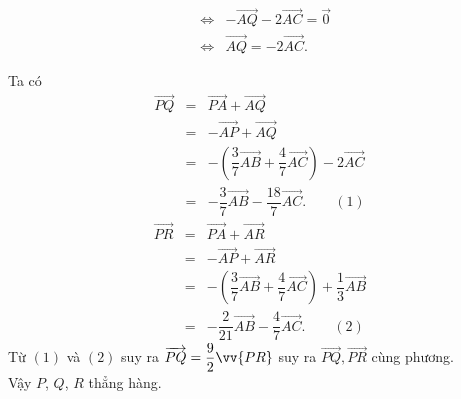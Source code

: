 \begin{bt}
{\begin{itemize}
\begin{eqnarray*}
		\\
		&\Leftrightarrow&
		-\overrightarrow{AQ}-2\overrightarrow{AC}=\overrightarrow{0}
		\\
		&\Leftrightarrow&
		\overrightarrow{AQ}=-2\overrightarrow{AC}.
	\end{eqnarray*}
	\end{itemize}	
	Ta có 
	\allowdisplaybreaks
	\begin{eqnarray*}
		\overrightarrow{PQ}&=&\overrightarrow{PA}+\overrightarrow{AQ}
		\\
		&=&-\overrightarrow{AP}+\overrightarrow{AQ}
		\\
		&=&-\left(\dfrac{3}{7}\overrightarrow{AB}+\dfrac{4}{7}\overrightarrow{AC}\right)-2\overrightarrow{AC}
		\\
		&=&-\dfrac{3}{7}\overrightarrow{AB}-\dfrac{18}{7}\overrightarrow{AC}. \qquad(1)
	\end{eqnarray*}
	\allowdisplaybreaks
	\begin{eqnarray*}
		\overrightarrow{PR}&=&\overrightarrow{PA}+\overrightarrow{AR}
		\\
		&=&-\overrightarrow{AP}+\overrightarrow{AR}
		\\
		&=&-\left(\dfrac{3}{7}\overrightarrow{AB}+\dfrac{4}{7}\overrightarrow{AC}\right)+\dfrac{1}{3}\overrightarrow{AB}
		\\
		&=&-\dfrac{2}{21}\overrightarrow{AB}-\dfrac{4}{7}\overrightarrow{AC}. \qquad(2)
	\end{eqnarray*}
	Từ $(1)$ và $(2)$ suy ra $\overrightarrow{PQ}=\dfrac{9}{2}\vv{PR}$ suy ra $\overrightarrow{PQ}, \overrightarrow{PR}$ cùng phương.\\
	Vậy $P$, $Q$, $R $ thẳng hàng.
	}
\end{bt}
